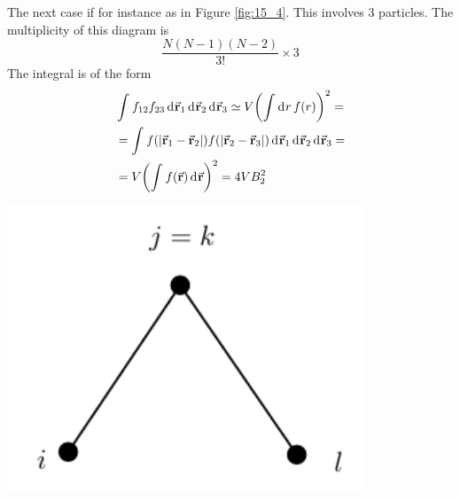 \documentclass[../main/main.tex]{subfiles}
\begin{document}
\begin{minipage}[c]{0.7\linewidth}
The next case if for instance as in Figure \ref{fig:15_4}. This involves 3 particles.
The multiplicity of this diagram is
\begin{equation*}
  \frac{N (N-1) (N-2)}{3!} \times 3
\end{equation*}
The integral is of the form
\begin{equation}
\begin{split}
  & \int_{}^{}  f_{12} f_{23} \dd[]{\va{r}_1}  \dd[]{\va{r}_2}   \dd[]{\va{r}_3}
  \simeq V  \qty(  \int_{}^{} \dd[]{r} f(r)  )^2  = \\
  & =   \int_{}^{}  f( \abs{\va{r}_1 - \va{r}_2} )f( \abs{\va{r}_2 - \va{r}_3} ) \dd[]{\va{r}_1}  \dd[]{\va{r}_2}  \dd[]{\va{r}_3}  = \\
  & = V \qty(\int_{}^{} f(\va{r})\dd[]{\va{r}}  )^2  = 4 V B_2^2
  \label{eq:15_3}
\end{split}
\end{equation}
\end{minipage}
\begin{minipage}[]{0.3\linewidth}
\centering
\includegraphics[width=0.8\textwidth]{../lessons/15_image/7.pdf}
\end{minipage}

\vspace{0.5cm}
\end{document}

